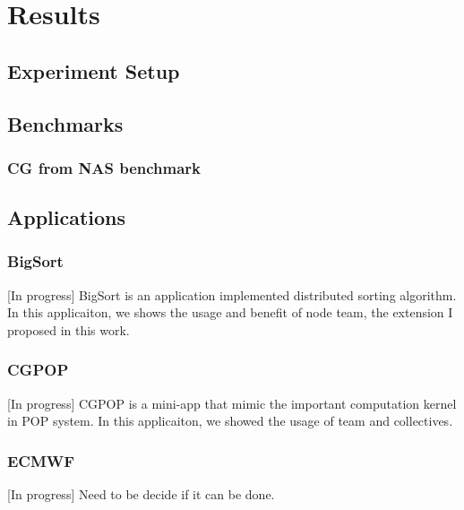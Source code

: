 \chapter{Results}\label{chap:Results}
\section{Experiment Setup}
\section{Benchmarks}
\subsection{CG from NAS benchmark}

\section{Applications}
\subsection{BigSort}
[In progress]
BigSort is an application implemented distributed sorting algorithm. In this applicaiton, we shows the usage and benefit of node team, the extension I proposed in this work. 
\subsection{CGPOP}
[In progress]
CGPOP is a mini-app that mimic the important computation kernel in POP system. In this applicaiton, we showed the usage of team and collectives. 
\subsection{ECMWF}
[In progress]
Need to be decide if it can be done. 

